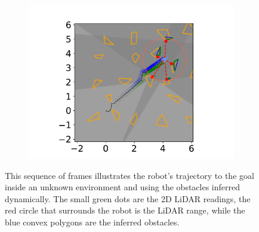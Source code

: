 \begin{figure}[H]
\begin{subfigure}{0.20\textwidth}
        \includegraphics[width=\textwidth]{../figures/Simulations/sim2unkenv/frame_9.pdf}
    \end{subfigure}
    \caption[short]{This sequence of frames illustrates the robot's trajectory to the goal inside an unknown environment and using the obstacles inferred dynamically.  The small green dots are the 2D LiDAR readings, the red circle that surrounds the robot is the LiDAR range, while the blue convex polygons are the inferred obstacles.}
    \label{fig:unk_env_frames}
\end{figure}

